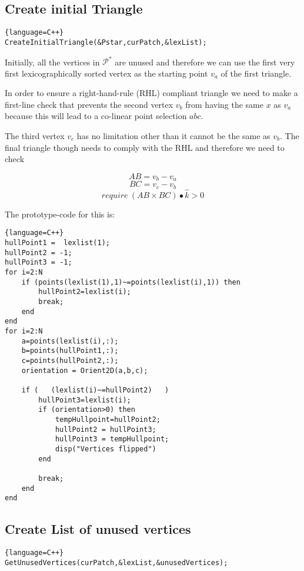 \documentclass[11pt,letterpaper,titlepage]{article}
\begin{document}
\subsection{Create initial Triangle}

\begin{lstlisting}{language=C++}
CreateInitialTriangle(&Pstar,curPatch,&lexList);
\end{lstlisting}

\noindent
Initially, all the vertices in $\mathcal{P}^*$ are unused and therefore we can use the first very first lexicographically sorted vertex as the starting point $v_a$ of the first triangle.

In order to ensure a right-hand-rule (RHL) compliant triangle we need to make a first-line check that prevents the second vertex $v_b$ from having the same $x$ as $v_a$ because this will lead to a co-linear point selection $abc$. 

The third vertex $v_c$ has no limitation other than it cannot be the same as $v_b$. The final triangle though needs to comply with the RHL and therefore we need to check 

$$ AB = v_b - v_a $$
$$ BC = v_c - v_b $$
$$ require \ (AB \times BC)\bullet \hat{k} > 0$$

The prototype-code for this is:
\begin{lstlisting}{language=C++}
hullPoint1 =  lexlist(1);
hullPoint2 = -1;
hullPoint3 = -1;
for i=2:N
    if (points(lexlist(1),1)~=points(lexlist(i),1)) then
        hullPoint2=lexlist(i);
        break;
    end
end
for i=2:N
    a=points(lexlist(i),:);
    b=points(hullPoint1,:);
    c=points(hullPoint2,:);
    orientation = Orient2D(a,b,c);
    
    if (   (lexlist(i)~=hullPoint2)   )
        hullPoint3=lexlist(i);
        if (orientation>0) then
            tempHullpoint=hullPoint2;
            hullPoint2 = hullPoint3;
            hullPoint3 = tempHullpoint;
            disp("Vertices flipped")
        end
        
        break;
    end
end
\end{lstlisting}

\subsection{Create List of unused vertices}

\begin{lstlisting}{language=C++}
GetUnusedVertices(curPatch,&lexList,&unusedVertices);
\end{lstlisting}
\end{document}

